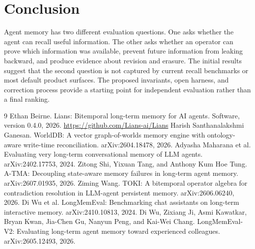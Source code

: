 \documentclass[11pt]{article}
\begin{document}
\section{Conclusion}
Agent memory has two different evaluation questions. One asks whether the agent can recall useful information. The other asks whether an operator can prove which information was available, prevent future information from leaking backward, and produce evidence about revision and erasure. The initial results suggest that the second question is not captured by current recall benchmarks or most default product surfaces. The proposed invariants, open harness, and correction process provide a starting point for independent evaluation rather than a final ranking.

\begin{thebibliography}{9}
 Ethan Beirne. Lians: Bitemporal long-term memory for AI agents. Software, version 0.4.0, 2026. \url{https://github.com/Lians-ai/Lians}
 Harish Santhanalakshmi Ganesan. WorldDB: A vector graph-of-worlds memory engine with ontology-aware write-time reconciliation. arXiv:2604.18478, 2026.
 Adyasha Maharana et al. Evaluating very long-term conversational memory of LLM agents. arXiv:2402.17753, 2024.
 Zitong Shi, Yixuan Tang, and Anthony Kum Hoe Tung. A-TMA: Decoupling state-aware memory failures in long-term agent memory. arXiv:2607.01935, 2026.
 Ziming Wang. TOKI: A bitemporal operator algebra for contradiction resolution in LLM-agent persistent memory. arXiv:2606.06240, 2026.
 Di Wu et al. LongMemEval: Benchmarking chat assistants on long-term interactive memory. arXiv:2410.10813, 2024.
 Di Wu, Zixiang Ji, Asmi Kawatkar, Bryan Kwan, Jia-Chen Gu, Nanyun Peng, and Kai-Wei Chang. LongMemEval-V2: Evaluating long-term agent memory toward experienced colleagues. arXiv:2605.12493, 2026.
\end{thebibliography}
\end{document}
